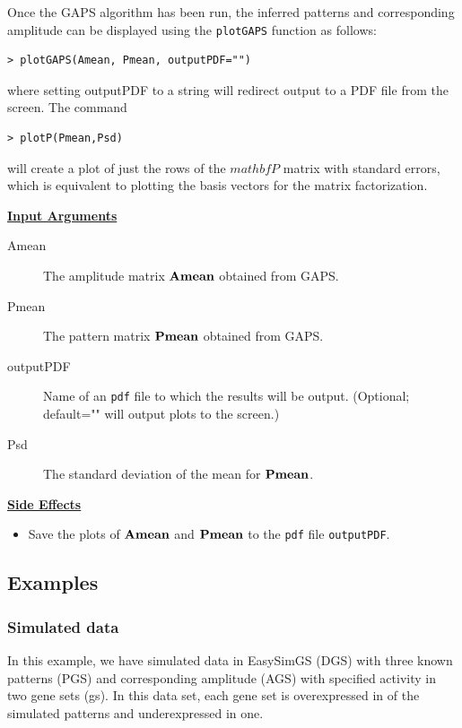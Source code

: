\documentclass{report}
\begin{document}
\par Once the GAPS algorithm has been run, the inferred patterns and corresponding amplitude can be displayed using the \texttt{plotGAPS} function as follows:
\begin{verbatim}
> plotGAPS(Amean, Pmean, outputPDF="")
\end{verbatim}
where setting outputPDF to a string will redirect output to a PDF file from the screen.  The command
\begin{verbatim}
> plotP(Pmean,Psd)
\end{verbatim}
will create a plot of just the rows of the $mathbf{P}$ matrix with standard errors, which is equivalent to plotting the basis vectors for the matrix factorization.

\par \noindent \textbf{\underline{Input Arguments}}
\begin{description}
\item[Amean]{The amplitude matrix ${\bf{Amean}}$ obtained from GAPS.}
\item[Pmean]{The pattern matrix ${\bf{Pmean}}$ obtained from GAPS.}
\item[outputPDF]{Name of an \texttt{pdf} file to which the results will be output.  (Optional; default="" will output plots to the screen.)}
\item[Psd]{The standard deviation of the mean for ${\bf{Pmean}}$.}
\end{description}

\par \noindent \textbf{\underline{Side Effects}}
\begin{itemize}
  \item Save the plots of ${\bf{Amean}}$ and ${\bf{Pmean}}$ to the \texttt{pdf} file \texttt{outputPDF}.
\end{itemize}

\subsection{Examples}

\subsubsection{Simulated data}

\par In this example, we have simulated data in EasySimGS (DGS) with three known patterns (PGS) and corresponding amplitude (AGS) with specified activity in two gene sets (gs).  In this data set, each gene set is overexpressed in of the simulated patterns and underexpressed in one.
\end{document}
